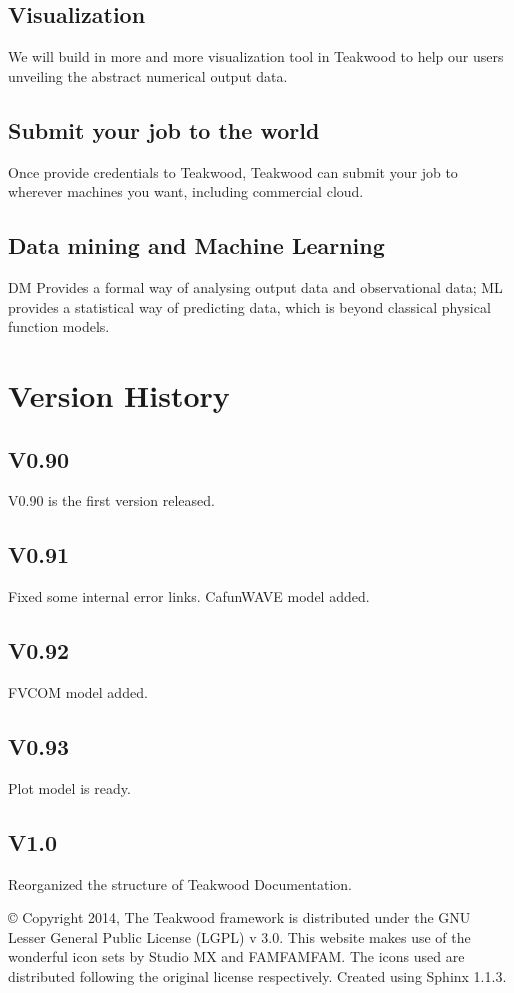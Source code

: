 \documentclass[letterpaper,10pt,openany, oneside]{sphinxmanual}
\begin{document}
\section{Visualization}
\label{futurework:visualization}
We will build in more and more visualization tool in Teakwood to help our users unveiling the abstract numerical output data.


\section{Submit your job to the world}
\label{futurework:submit-your-job-to-the-world}
Once provide credentials to Teakwood, Teakwood can submit your job to wherever machines you want, including commercial cloud.


\section{Data mining and Machine Learning}
\label{futurework:data-mining-and-machine-learning}
DM Provides a formal way of analysing output data and observational data;
ML provides a statistical way of predicting data, which is beyond classical physical function models.


\chapter{Version History}
\label{history:version-history}\label{history::doc}

\section{V0.90}
\label{history:v0-90}
V0.90 is the first version released.


\section{V0.91}
\label{history:v0-91}
Fixed some internal error links.
CafunWAVE model added.


\section{V0.92}
\label{history:v0-92}
FVCOM model added.


\section{V0.93}
\label{history:v0-93}
Plot model is ready.


\section{V1.0}
\label{history:v1-0}
Reorganized the structure of Teakwood Documentation.

© Copyright 2014, The Teakwood framework is distributed under the GNU Lesser General Public License (LGPL) v 3.0. This website
makes use of the wonderful icon sets by Studio MX and FAMFAMFAM. The icons used are distributed following the original
license respectively. Created using Sphinx 1.1.3.



\renewcommand{\indexname}{Index}
\printindex
\end{document}
